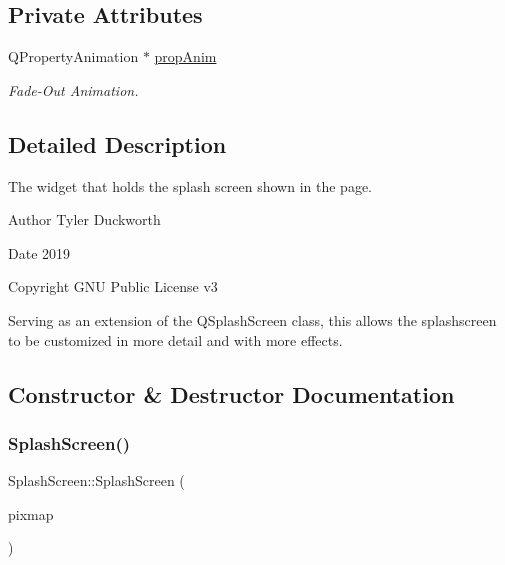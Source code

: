 \subsection*{Private Attributes}
\begin{DoxyCompactItemize}
\item 
Q\+Property\+Animation $\ast$ \mbox{\hyperlink{classSplashScreen_ad24181386e6732f6ce5d69e5ddc16cd9}{prop\+Anim}}
\begin{DoxyCompactList}\small\item\em Fade-\/\+Out Animation. \end{DoxyCompactList}\end{DoxyCompactItemize}


\subsection{Detailed Description}
The widget that holds the splash screen shown in the page. 

\begin{DoxyAuthor}{Author}
Tyler Duckworth 
\end{DoxyAuthor}
\begin{DoxyDate}{Date}
2019 
\end{DoxyDate}
\begin{DoxyCopyright}{Copyright}
G\+NU Public License v3
\end{DoxyCopyright}
Serving as an extension of the Q\+Splash\+Screen class, this allows the splashscreen to be customized in more detail and with more effects. 

\subsection{Constructor \& Destructor Documentation}
\mbox{\label{classSplashScreen_a25b099ed5f03150091a21ba6fd83fa39}} 
\subsubsection{\texorpdfstring{SplashScreen()}{SplashScreen()}}
{\footnotesize\ttfamily Splash\+Screen\+::\+Splash\+Screen (\begin{DoxyParamCaption}\item[{const Q\+Pixmap \&}]{pixmap }\end{DoxyParamCaption})\hspace{0.3cm}{\ttfamily [explicit]}}

